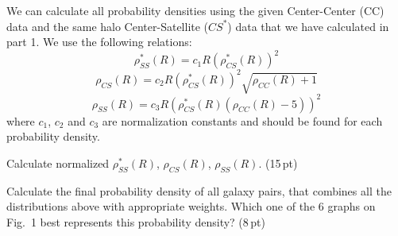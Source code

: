 \begin{description}
  We can calculate all probability densities using the given Center-Center
  (CC) data and the same halo Center-Satellite ($CS^*$) data that we have
  calculated in part 1. We use the following relations:
  \[ \rho_{SS}^*(R) = c_1 R\left(\rho_{CS}^*(R)\right)^2 \]
  \[ \rho_{CS}(R) = c_2 R\left(\rho_{CS}^*(R)\right)^2
     \sqrt{\rho_{CC}(R) + 1} \]
  \[ \rho_{SS}(R) = c_3 R\left(\rho_{CS}^*(R)\left(\rho_{CC}(R)
     - 5\right)\right)^2 \]
  where $c_1$, $c_2$ and $c_3$ are normalization constants and should be found
  for each probability density.
\item[b)] Calculate normalized $\rho_{SS}^*(R)$, $\rho_{CS}(R)$,
  $\rho_{SS}(R)$. \hfill(15\,pt)
\item[c)] Calculate the final probability density of all galaxy pairs, that
  combines all the distributions above with appropriate weights. Which one of
  the 6 graphs on Fig.~1 best represents this probability density?
  \hfill(8\,pt)
\end{description}
